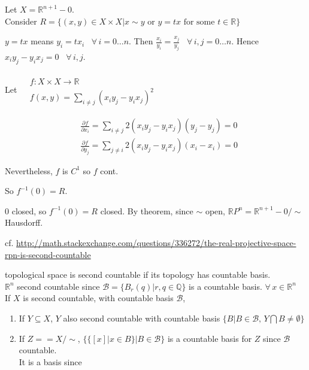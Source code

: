 Let $X = \mathbb{R}^{n+1} -0$.  \\
Consider $R = \lbrace ( x,y) \in X \times X | x\sim y \text{ or } y = tx \text{ for some } t \in \mathbb{R} \rbrace$ 

$y = tx$ means $y_i = tx_i$ \, $\forall \, i = 0\dots n$.  Then $\frac{ x_i}{y_i} = \frac{ x_j}{ y_j}$ \, $\forall \, i,j = 0 \dots n$.  Hence $x_i y_j - y_i x_j = 0$ \, $\forall \, i , j$.  

Let $\begin{aligned} & \quad \\ 
  & f : X \times X \to \mathbb{R} \\
  & f(x,y) = \sum_{ i \neq j} (x_i y_j - y_i x_j)^2 \end{aligned}$  

\[
\begin{aligned}
  & \frac{ \partial f}{ \partial x_i} = \sum_{i \neq j } 2 (x_i y_j - y_i x_j) ( y_j - y_j) = 0 \\
  & \frac{ \partial f}{ \partial y_j} = \sum_{j \neq i } 2 (x_i y_j - y_i x_j) ( x_i - x_i) = 0 
\end{aligned}
\]

Nevertheless, $f$ is $C^1$ so $f$ cont.  

So $f^{-1}(0) = R$. 

$0$ closed, so $f^{-1}(0) = R$ closed.  By theorem, since $\sim$ open, $\mathbb{R}P^n = \mathbb{R}^{n+1} - 0 / \sim$ Hausdorff.  

cf. \url{http://math.stackexchange.com/questions/336272/the-real-projective-space-rpn-is-second-countable}

topological space is second countable if its topology has countable basis.  \\
\quad $\mathbb{R}^n$ second countable since $\mathcal{B} = \lbrace B_r{ ( q)} | r,q \in \mathbb{Q} \rbrace$ is a countable basis.  $\forall \, x \in \mathbb{R}^n$ \\

If $X$ is second countable, with countable basis $\mathcal{B}$, 
\begin{enumerate}
\item If $Y \subseteq X$, $Y$ also second countable with countable basis $\lbrace B | B \in \mathcal{B}, \, Y \bigcap B \neq \emptyset \rbrace$
\item If $Z == X/\sim $, $\lbrace \lbrace [x] | x \in B \rbrace | B \in \mathcal{B} \rbrace$ is a countable basis for $Z$ since $\mathcal{B}$ countable.  \\

It is a basis since 



\end{enumerate}

